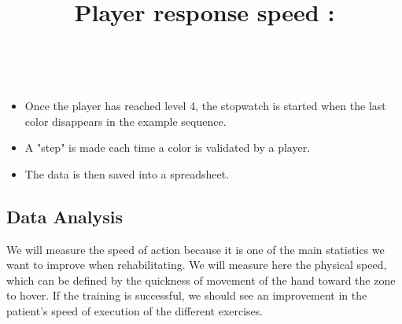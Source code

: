 \documentclass[12pt, openany, twocolumn]{article}
\begin{document}
                \title{Player response speed :}\\
                    \begin{itemize}
                        \item{Once the player has reached level 4, the stopwatch is started when the last color disappears in the example sequence.} \\
                        \item{A "step" is made each time a color is validated by a player.} \\
                        \item{The data is then saved into a spreadsheet.} \\  
                    \end{itemize}


    


    \subsection{Data Analysis\label{data}}
    

    
    We will measure the speed of action because it is one of the main statistics we want to improve when rehabilitating. 
    We will measure here the physical speed, which can be defined by the quickness of movement of the hand toward the zone to hover.
    If the training is successful, we should see an improvement in the patient's speed of execution of the different exercises.
    \\
\end{document}
